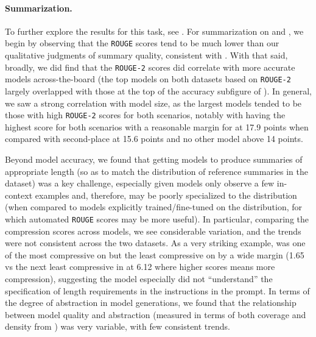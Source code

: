 \paragraph{Summarization.}
To further explore the results for this task, see .
For summarization on \cnndm and \xsum, we begin by observing that the \texttt{ROUGE} scores tend to be much lower than our qualitative judgments of summary quality, consistent with \citet{goyal2022news}.
With that said, broadly, we did find that the \texttt{ROUGE-2} scores did correlate with more accurate models across-the-board (\eg the top models on both datasets based on \texttt{ROUGE-2} largely overlapped with those at the top of the accuracy subfigure of ).
In general, we saw a strong correlation with model size, as the largest models tended to be those with high \texttt{ROUGE-2} scores for both scenarios, notably with \mtnlgfivethreezero having the highest score for both scenarios with a reasonable margin for \xsum at 17.9 points when compared with second-place \optonesevenfive at 15.6 points and no other model above 14 points. 

Beyond model accuracy, we found that getting models to produce summaries of appropriate length (so as to match the distribution of reference summaries in the dataset) was a key challenge, especially given models only observe a few in-context examples and, therefore, may be poorly specialized to the distribution (when compared to models explicitly trained/fine-tuned on the distribution, for which automated \texttt{ROUGE} scores may be more useful). 
In particular, comparing the compression scores across models, we see considerable variation, and the trends were not consistent across the two datasets.
As a very striking example, \gptada was one of the most compressive on \cnndm but the least compressive on \xsum by a wide margin (1.65 vs the next least compressive in \gptbabbage at 6.12 where higher scores means more compression), suggesting the \gptada model especially did not ``understand'' the specification of length requirements in the instructions in the prompt. 
In terms of the degree of abstraction in model generations, we found that the relationship between model quality and abstraction (measured in terms of both coverage and density from \citet{grusky2018newsroom}) was very variable, with few consistent trends.

